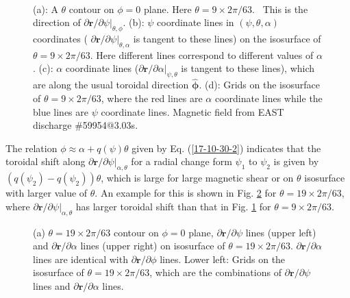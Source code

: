 \documentclass{article}
\newcommand{\nobracket}{}
\newcommand{\tmmathbf}[1]{\ensuremath{\boldsymbol{#1}}}
\begin{document}
\

\begin{figure}[h]
  
  \caption{\label{17-9-16-1}(a): A $\theta$ contour on $\phi = 0$ plane. Here
  $\theta = 9 \times 2 \pi / 63$. \ This is the direction of $\partial
  \mathbf{r}/ \partial \psi |_{\theta, \phi} \nobracket$. (b): $\psi$
  coordinate lines in $(\psi, \theta, \alpha)$ coordinates ( $\partial
  \mathbf{r}/ \partial \psi |_{\theta, \alpha} \nobracket$ is tangent to these
  lines) on the isosurface of $\theta = 9 \times 2 \pi / 63$. Here different
  lines correspond to different values of $\alpha$. (c): $\alpha$ coordinate
  lines ($\partial \mathbf{r}/ \partial \alpha |_{\psi, \theta} \nobracket$ is
  tangent to these lines), which are along the usual toroidal direction
  $\hat{\tmmathbf{\phi}}$. (d): Grids on the isosurface of $\theta = 9 \times
  2 \pi / 63$, where the red lines are $\alpha$ coordinate lines while the
  blue lines are $\psi$ coordinate lines. Magnetic field from EAST discharge
  \#59954@3.03s.}
\end{figure}

The relation $\phi \approx \alpha + q (\psi) \theta$ given by Eq.
(\ref{17-10-30-2}) indicates that the toroidal shift along $\partial
\mathbf{r}/ \partial \psi |_{\alpha, \theta} \nobracket$ for a radial change
form $\psi_1$ to $\psi_2$ is given by $(q (\psi_2) - q (\psi_2)) \theta$,
which is large for large magnetic shear or on $\theta$ isosurface with larger
value of $\theta$. An example for this is shown in Fig. \ref{17-10-30-5} for
$\theta = 19 \times 2 \pi / 63$, where $\partial \mathbf{r}/ \partial \psi
|_{\alpha, \theta} \nobracket$ has larger toroidal shift than that in Fig.
\ref{17-9-16-1} for $\theta = 9 \times 2 \pi / 63$.

\begin{figure}[h]
  
  \caption{\label{17-10-30-5}(a) $\theta = 19 \times 2 \pi / 63$ contour on
  $\phi = 0$ plane, $\partial \mathbf{r}/ \partial \psi$ lines (upper left)
  and $\partial \mathbf{r}/ \partial \alpha$ lines (upper right) on isosurface
  of $\theta = 19 \times 2 \pi / 63$. $\partial \mathbf{r}/ \partial \alpha$
  lines are identical with $\partial \mathbf{r}/ \partial \phi$ lines. Lower
  left: Grids on the isosurface of $\theta = 19 \times 2 \pi / 63$, which are
  the combinations of $\partial \mathbf{r}/ \partial \psi$ lines and $\partial
  \mathbf{r}/ \partial \alpha$ lines.}
\end{figure}
\end{document}
